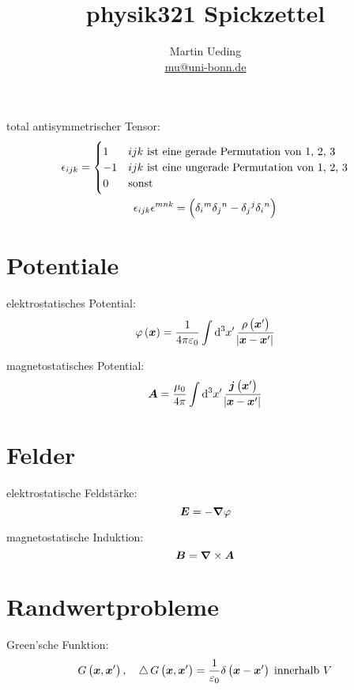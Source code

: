 

\hypersetup{
	pdftitle=
}


\title{physik321 Spickzettel}
\author{
	Martin Ueding \\
	\small{\href{mailto:mu@uni-bonn.de}{mu@uni-bonn.de}}
}



total antisymmetrischer Tensor:
\begin{gather*}
	\epsilon_{ijk}
	=
	\begin{cases}
		1 & \text{$ijk$ ist eine gerade Permutation von 1, 2, 3} \\
		-1 & \text{$ijk$ ist eine ungerade Permutation von 1, 2, 3} \\
		0 & \text{sonst}
	\end{cases} \\
	\epsilon_{ijk} \epsilon^{mnk} = \del{
		\delta_i{}^m \delta_j{}^n - \delta_j{}^j \delta_i{}^n
	} \\
\end{gather*}

\section{Potentiale}

elektrostatisches Potential:
\[
	\varphi\del{\vec x}
	= \frac{1}{4 \pi \varepsilon_0} \int \dif{^3 x'} \,
	\frac{\rho\del{\vec x'}}{\abs{\vec x - \vec x'}}
\]

magnetostatisches Potential:
\[
	\vec A
	= \frac{\mu_0}{4 \pi} \int \dif{^3 x'} \,
	\frac{\vec j\del{\vec x'}}{\abs{\vec x - \vec x'}}
\]

\section{Felder}

elektrostatische Feldstärke:
\[
	\boldsymbol{E} = - \boldsymbol{\nabla} \varphi
\]

magnetostatische Induktion:
\[
	\boldsymbol{B} = \boldsymbol{\nabla} \times \boldsymbol{A}
\]

\section{Randwertprobleme}

Green'sche Funktion:
\[
	G\del{\vec x, \vec x'}
	\eqnsep
	\laplace G\del{\vec x, \vec x'}
	= \frac{1}{\varepsilon_0} \delta\del{\vec x - \vec x'} \; \text{innerhalb $V$}
\]

